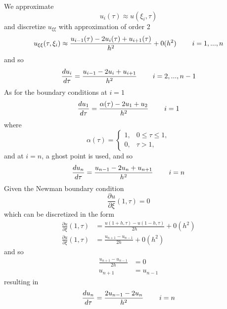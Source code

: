 \documentclass{article}
\begin{document}
We approximate
\begin{equation}
    u_i(\tau) \approx u(\xi_i,\tau)
\end{equation}
and discretize $u_{\xi \xi}$ with approximation of order 2
\begin{equation}
    u_{\xi \xi}(\tau,\xi_i) \approx \frac{u_{i-1}(\tau) - 2u_i(\tau) + u_{i+1}(\tau)}{h^2} + 0(h^2) \hspace{0.8cm} i = 1, ..., n
\end{equation}
and so
\begin{equation}
    \frac{d u_i}{d\tau} = \frac{u_{i-1} - 2u_i + u_{i+1}}{h^2}  \hspace{0.8cm} i = 2, ..., n-1
\end{equation}
As for the boundary conditions at $i = 1$
\begin{equation}
    \frac{d u_1}{d\tau} = \frac{\alpha(\tau) - 2u_1 + u_{2}}{h^2}  \hspace{0.8cm} i = 1
\end{equation}
where 
\begin{equation} 
  \alpha(\tau)= 
\begin{cases}
    1,           & 0 \leq \tau \leq 1, \\
    0,              & \tau > 1,
\end{cases}
\end{equation}
and at $i = n$, a ghost point is used, and so
\begin{equation}
    \frac{d u_n}{d\tau} = \frac{u_{n-1} - 2u_n + u_{n+1}}{h^2}  \hspace{0.8cm} i = n
\end{equation}
Given the Newman boundary condition
\begin{equation}
    \frac{\partial u}{\partial \xi} (1,\tau) = 0
\end{equation}
which can be discretized in the form
\begin{equation}
\begin{split}
        \frac{\partial u}{\partial \xi} (1,\tau) &= \frac{u(1+h,\tau)-u(1-h,\tau)}{2h} + 0(h^2)\\
         \frac{\partial u}{\partial \xi} (1,\tau) &= \frac{u_{n+1}-u_{n-1}}{2h} + 0(h^2)
\end{split}
\end{equation}
and so
\begin{equation}
\begin{split}
    \frac{u_{n+1}-u_{n-1}}{2h} &= 0 \\
    u_{n+1} &= u_{n-1}
\end{split}
\end{equation}
resulting in
\begin{equation}
    \frac{d u_n}{d\tau} = \frac{2u_{n-1} - 2u_n}{h^2}  \hspace{0.8cm} i = n
\end{equation}
\end{document}
